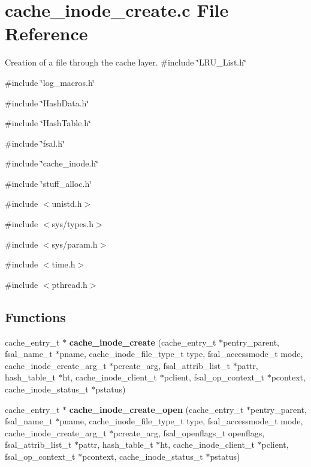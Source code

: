 \section{cache\_\-inode\_\-create.c File Reference}
\label{cache__inode__create_8c}


Creation of a file through the cache layer.  
{\ttfamily \#include \char`\"{}LRU\_\-List.h\char`\"{}}\par
{\ttfamily \#include \char`\"{}log\_\-macros.h\char`\"{}}\par
{\ttfamily \#include \char`\"{}HashData.h\char`\"{}}\par
{\ttfamily \#include \char`\"{}HashTable.h\char`\"{}}\par
{\ttfamily \#include \char`\"{}fsal.h\char`\"{}}\par
{\ttfamily \#include \char`\"{}cache\_\-inode.h\char`\"{}}\par
{\ttfamily \#include \char`\"{}stuff\_\-alloc.h\char`\"{}}\par
{\ttfamily \#include $<$unistd.h$>$}\par
{\ttfamily \#include $<$sys/types.h$>$}\par
{\ttfamily \#include $<$sys/param.h$>$}\par
{\ttfamily \#include $<$time.h$>$}\par
{\ttfamily \#include $<$pthread.h$>$}\par
\subsection*{Functions}
\begin{DoxyCompactItemize}
\item 
cache\_\-entry\_\-t $\ast$ {\bf cache\_\-inode\_\-create} (cache\_\-entry\_\-t $\ast$pentry\_\-parent, fsal\_\-name\_\-t $\ast$pname, cache\_\-inode\_\-file\_\-type\_\-t type, fsal\_\-accessmode\_\-t mode, cache\_\-inode\_\-create\_\-arg\_\-t $\ast$pcreate\_\-arg, fsal\_\-attrib\_\-list\_\-t $\ast$pattr, hash\_\-table\_\-t $\ast$ht, cache\_\-inode\_\-client\_\-t $\ast$pclient, fsal\_\-op\_\-context\_\-t $\ast$pcontext, cache\_\-inode\_\-status\_\-t $\ast$pstatus)
\item 
cache\_\-entry\_\-t $\ast$ {\bf cache\_\-inode\_\-create\_\-open} (cache\_\-entry\_\-t $\ast$pentry\_\-parent, fsal\_\-name\_\-t $\ast$pname, cache\_\-inode\_\-file\_\-type\_\-t type, fsal\_\-accessmode\_\-t mode, cache\_\-inode\_\-create\_\-arg\_\-t $\ast$pcreate\_\-arg, fsal\_\-openflags\_\-t openflags, fsal\_\-attrib\_\-list\_\-t $\ast$pattr, hash\_\-table\_\-t $\ast$ht, cache\_\-inode\_\-client\_\-t $\ast$pclient, fsal\_\-op\_\-context\_\-t $\ast$pcontext, cache\_\-inode\_\-status\_\-t $\ast$pstatus)
\end{DoxyCompactItemize}


